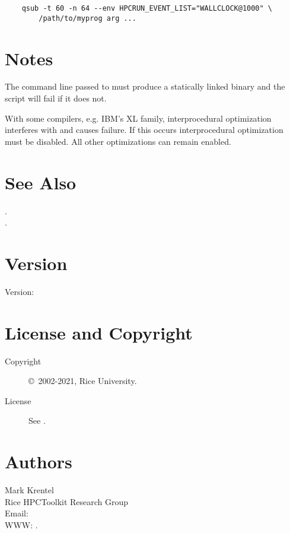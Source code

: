 \documentclass[english]{article}
\begin{document}
\begin{verbatim}
    qsub -t 60 -n 64 --env HPCRUN_EVENT_LIST="WALLCLOCK@1000" \
        /path/to/myprog arg ...
\end{verbatim}


\section{Notes}

The command line passed to  must produce a statically linked binary and the  script will fail if it does not.

With some compilers, e.g. IBM's XL family,
interprocedural optimization interferes with  and causes failure.
If this occurs interprocedural optimization must be disabled.
All other optimizations can remain enabled.


\section{See Also}

.\\
.

\section{Version}

Version: \Version

\section{License and Copyright}

\begin{description}
\item[Copyright] \copyright\ 2002-2021, Rice University.
\item[License] See .
\end{description}

\section{Authors}

\noindent
Mark Krentel \\
Rice HPCToolkit Research Group \\
Email:  \\
WWW: .

\LatexManEnd
\end{document}
